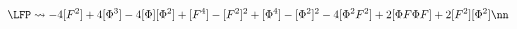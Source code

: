 \begin{equation}
\LFP \leadsto 
-4[F^2] 
+4 [\Phi^3] - 4 [\Phi] [\Phi^2]
+[F^4] 
-[F^2]^2
+ [\Phi^4]
-[\Phi^2]^2
- 4[\Phi^2 F^2] + 2[\Phi F\Phi F]
+2[F^2][\Phi^2]\nn
\end{equation}

